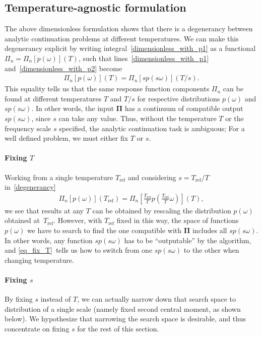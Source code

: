 \documentclass[notitlepage,11pt,nofootinbib]{revtex4-1}
\renewcommand{\vec}[1]{\bm{#1}}
\begin{document}
\subsection{Temperature-agnostic formulation}
\label{section_temperature_agnostic}
The above dimensionless formulation shows that there is a degenerancy between analytic continuation problems at different temperatures. We can make this degenerancy explicit by writing integral~\eqref{dimensionless_with_p1} as a functional $\Pi_n = \Pi_n[p(\omega)](T)$, such that lines~\eqref{dimensionless_with_p1} and~\eqref{dimensionless_with_p2} become 
\begin{align}
\Pi_n[p(\omega)](T) = \Pi_n[sp(s\omega)](T/s).
\label{degenerancy}
\end{align}
This equality tells us that the same response function components $\Pi_n$ can be found at different temperatures $T$ and $T/s$ for respective distributions $p(\omega)$ and $sp(s\omega)$. In other words, the input $\vec \Pi$ has a continuum of compatible output $sp(s\omega)$, since $s$ can take any value. Thus, without the temperature $T$ or the frequency scale $s$ specified, the analytic continuation task is ambiguous; For a well defined problem, we must either fix $T$ or $s$.

\paragraph*{Fixing $T$}
Working from a single temperature $T_\text{{ref}}$ and considering $s=T_\text{{ref}}/T$ in~\eqref{degenerancy}
\begin{align}
    \Pi_n[p(\omega)](T_\text{{ref}}) = \Pi_n[\tfrac{T_{\text{ref}}}{T} p(\tfrac{T_{\text{ref}}}{T}\omega)](T),
    \label{eq_fix_T}
\end{align}
we see that results at any $T$ can be obtained by rescaling the distribution $p(\omega)$ obtained at~$T_\text{{ref}}$. 
However, with $T_\text{{ref}}$ fixed in this way, the space of functions $p(\omega)$ we have to search to find the one compatible with $\vec \Pi$ includes all $sp(s\omega)$. In other words, any function $sp(s\omega)$ has to be ``outputable'' by the algorithm, and \eqref{eq_fix_T}~tells us how to switch from one $sp(s\omega)$ to the other when changing temperature.

\paragraph*{Fixing $s$}
By fixing $s$ instead of $T$, we can actually narrow down that search space to distribution of a single scale (namely fixed second central moment, as shown below). We hypothesize that narrowing the search space is desirable, and thus concentrate on fixing $s$ for the rest of this section.
\end{document}
